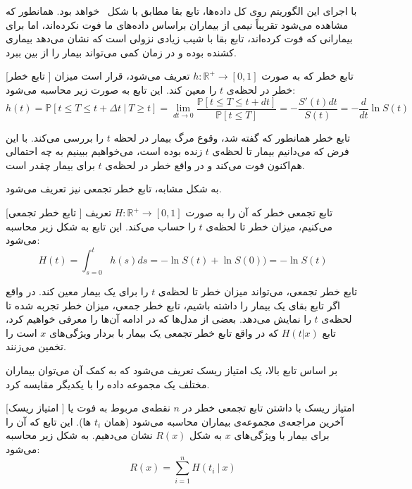 	
با اجرای این الگوریتم روی کل داده‌ها، تابع بقا مطابق با شکل~ خواهد بود. همانطور که مشاهده می‌شود تقریباً نیمی از بیماران براساس داده‌های ما فوت نکرده‌اند، اما برای بیمارانی که فوت کرده‌اند، تابع بقا با شیب زیادی نزولی است که نشان می‌دهد بیماری کشنده بوده و در زمان کمی می‌تواند بیمار را از بین ببرد. 

[تابع خطر  ]
تابع خطر که به صورت 
$h: \mathbb{R}^{+} \rightarrow \left[0, 1\right]$
تعریف می‌شود، قرار است میزان خطر در لحظه‌ی $t$ را معین کند. این تابع به صورت زیر محاسبه می‌شود:
$$h(t) = \mathbb{P}\left[t \leq T \leq t+\Delta t \ |\ T \geq t\right]
= \lim_{dt\rightarrow 0} \frac{\mathbb{P}\left[t\leq T\leq t+dt\right]}{\mathbb{P}\left[t \leq T\right]}
=
-\frac{S'(t) dt}{S(t)} = -\frac{d}{dt}\ln{S(t)}
$$

تابع خطر همانطور که گفته شد، وقوع مرگ بیمار در لحظه $t$ را بررسی می‌کند. با این فرض که می‌دانیم بیمار تا لحظه‌ی $t$ زنده بوده است، می‌خواهیم ببینیم به چه احتمالی هم‌اکنون فوت می‌کند و در واقع خطر در لحظه‌ی $t$ برای بیمار چقدر است.


به شکل مشابه، تابع خطر تجمعی  نیز تعریف می‌شود.

[تابع خطر تجمعی ]
تابع تجمعی خطر که آن را به صورت 
$H: \mathbb{R}^{+} \rightarrow \left[0, 1\right]$
تعریف می‌کنیم، میزان خطر تا لحظه‌ی $t$ را حساب می‌کند. این تابع به شکل زیر محاسبه می‌شود:
$$H(t) = \int_{s=0}^t h(s) ds = -\ln{S(t)} + \ln{S(0))}
= -\ln{S(t)}$$

تابع خطر تجمعی، می‌تواند میزان خطر تا لحظه‌ی $t$ را برای یک بیمار معین کند. در واقع اگر تابع بقای یک بیمار را داشته باشیم، تابع خطر جمعی، میزان خطر تجربه شده تا لحظه‌ی $t$ را نمایش می‌دهد. بعضی از مدل‌ها که در ادامه آن‌ها را معرفی خواهیم کرد، تابع $H(t | x)$ که در واقع تابع خطر تجمعی یک بیمار با بردار ویژگی‌های $x$ است را تخمین می‌زنند.

بر اساس تابع بالا، یک امتیاز ریسک  تعریف می‌شود که به کمک آن می‌توان بیماران مختلف یک مجموعه داده را با یکدیگر مقایسه کرد.

[امتیاز ریسک ]
امتیاز ریسک با داشتن تابع تجمعی خطر در $n$ نقطه‌ی مربوط به فوت یا آخرین مراجعه‌ی مجموعه‌ی بیماران محاسبه می‌شود (همان $t_i$ ها). این تابع که آن را برای بیمار با ویژگی‌های $x$ به شکل 
$R(x)$
نشان می‌دهیم. به شکل زیر محاسبه می‌شود:
$$R(x) = \sum_{i=1}^n H(t_i \ |\ x)$$

